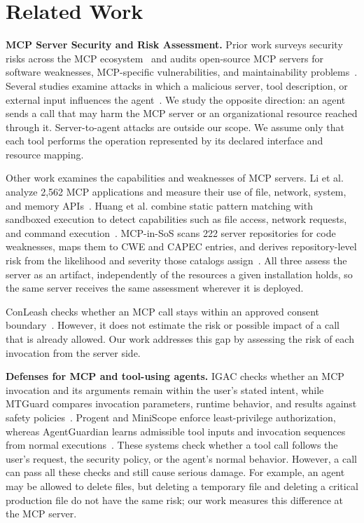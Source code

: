 \section{Related Work}
\label{sec:related}

\textbf{MCP Server Security and Risk Assessment.}
Prior work surveys security risks across the MCP
ecosystem~\cite{hou2026mcp} and audits open-source MCP servers for
software weaknesses, MCP-specific vulnerabilities, and maintainability
problems~\cite{hasan2025firstglance}. Several studies examine attacks in which
a malicious server, tool description, or external input influences the
agent~\cite{invariant2025toolpoisoning,shi2025toolhijacker,
zhao2025parasites}. We study the opposite direction: an agent sends a call that
may harm the MCP server or an organizational resource reached through it.
Server-to-agent attacks are outside our scope. We assume only that each tool
performs the operation represented by its declared interface and resource
mapping.

Other work examines the capabilities and weaknesses of MCP servers. Li et al.
analyze 2,562 MCP applications and measure their use of file, network, system,
and memory APIs~\cite{li2025privilege}. Huang et al. combine static pattern
matching with sandboxed execution to detect capabilities such as file access,
network requests, and command execution~\cite{huang2026auditing}. MCP-in-SoS
scans 222 server repositories for code weaknesses, maps them to CWE and CAPEC
entries, and derives repository-level risk from the likelihood and severity
those catalogs assign~\cite{kumar2026mcpinsos}. All three assess the server as
an artifact, independently of the resources a given installation holds, so the
same server receives the same assessment wherever it is deployed.

ConLeash checks whether an MCP call stays within an approved consent
boundary~\cite{li2026conleash}. However, it does not estimate the risk or
possible impact of a call that is already allowed. Our work addresses this gap
by assessing the risk of each invocation from the server side.

\textbf{Defenses for MCP and tool-using agents.}
IGAC checks whether an MCP invocation and its arguments remain within the
user's stated intent, while MTGuard compares invocation parameters, runtime
behavior, and results against safety policies~\cite{zhu2026igac,mtguard2026}.
Progent and MiniScope enforce least-privilege authorization, whereas
AgentGuardian learns admissible tool inputs and invocation sequences from
normal executions~\cite{shi2025progent,zhu2025miniscope,abaev2026agentguardian}.
These systems check whether a tool call follows the user's request, the
security policy, or the agent's normal behavior. However, a call can pass all
these checks and still cause serious damage. For example, an agent may be
allowed to delete files, but deleting a temporary file and deleting a critical
production file do not have the same risk; our work measures this difference at
the MCP server.

